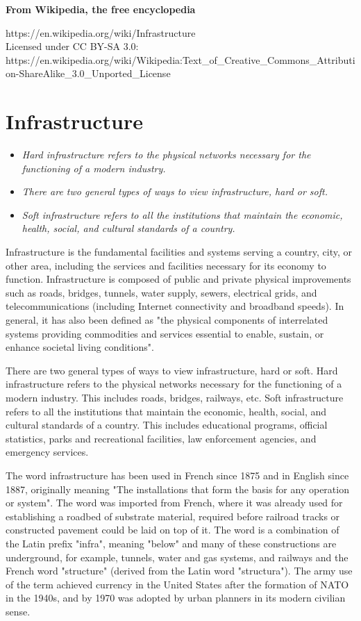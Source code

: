 \textbf{From Wikipedia, the free encyclopedia}

https://en.wikipedia.org/wiki/Infrastructure\\
Licensed under CC BY-SA 3.0:\\
https://en.wikipedia.org/wiki/Wikipedia:Text\_of\_Creative\_Commons\_Attribution-ShareAlike\_3.0\_Unported\_License

\section{Infrastructure}\label{infrastructure}

\begin{itemize}
\item
  \emph{Hard infrastructure refers to the physical networks necessary
  for the functioning of a modern industry.}
\item
  \emph{There are two general types of ways to view infrastructure, hard
  or soft.}
\item
  \emph{Soft infrastructure refers to all the institutions that maintain
  the economic, health, social, and cultural standards of a country.}
\end{itemize}

Infrastructure is the fundamental facilities and systems serving a
country, city, or other area, including the services and facilities
necessary for its economy to function. Infrastructure is composed of
public and private physical improvements such as roads, bridges,
tunnels, water supply, sewers, electrical grids, and telecommunications
(including Internet connectivity and broadband speeds). In general, it
has also been defined as "the physical components of interrelated
systems providing commodities and services essential to enable, sustain,
or enhance societal living conditions".

There are two general types of ways to view infrastructure, hard or
soft. Hard infrastructure refers to the physical networks necessary for
the functioning of a modern industry. This includes roads, bridges,
railways, etc. Soft infrastructure refers to all the institutions that
maintain the economic, health, social, and cultural standards of a
country. This includes educational programs, official statistics, parks
and recreational facilities, law enforcement agencies, and emergency
services.

The word infrastructure has been used in French since 1875 and in
English since 1887, originally meaning "The installations that form the
basis for any operation or system". The word was imported from French,
where it was already used for establishing a roadbed of substrate
material, required before railroad tracks or constructed pavement could
be laid on top of it. The word is a combination of the Latin prefix
"infra", meaning "below" and many of these constructions are
underground, for example, tunnels, water and gas systems, and railways
and the French word "structure" (derived from the Latin word
"structura"). The army use of the term achieved currency in the United
States after the formation of NATO in the 1940s, and by 1970 was adopted
by urban planners in its modern civilian sense.


